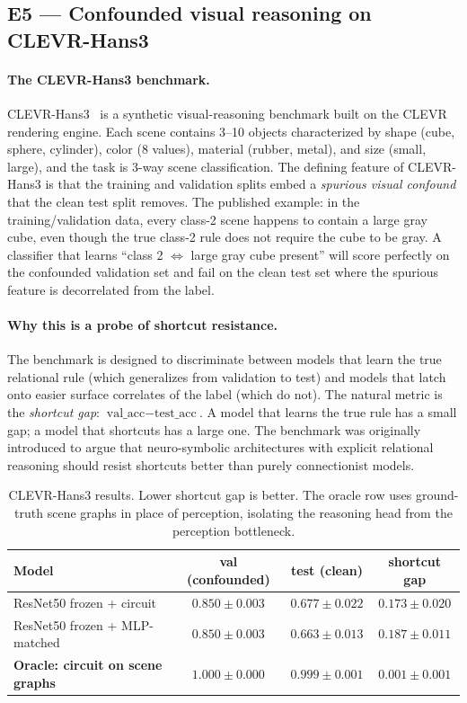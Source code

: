 \documentclass{article}
\begin{document}
\subsection{E5 --- Confounded visual reasoning on CLEVR-Hans3}
\label{sec:e5}

\paragraph{The CLEVR-Hans3 benchmark.}
CLEVR-Hans3~\citep{stammer2021right} is a synthetic visual-reasoning benchmark built on the CLEVR rendering engine.
Each scene contains 3--10 objects characterized by shape (cube, sphere, cylinder), color (8 values), material (rubber, metal), and size (small, large), and the task is 3-way scene classification.
The defining feature of CLEVR-Hans3 is that the training and validation splits embed a \emph{spurious visual confound} that the clean test split removes.
The published example: in the training/validation data, every class-2 scene happens to contain a large gray cube, even though the true class-2 rule does not require the cube to be gray.
A classifier that learns ``class 2 $\iff$ large gray cube present'' will score perfectly on the confounded validation set and fail on the clean test set where the spurious feature is decorrelated from the label.

\paragraph{Why this is a probe of shortcut resistance.}
The benchmark is designed to discriminate between models that learn the true relational rule (which generalizes from validation to test) and models that latch onto easier surface correlates of the label (which do not).
The natural metric is the \emph{shortcut gap}: $\text{val\_acc} - \text{test\_acc}$.
A model that learns the true rule has a small gap; a model that shortcuts has a large one.
The benchmark was originally introduced to argue that neuro-symbolic architectures with explicit relational reasoning should resist shortcuts better than purely connectionist models.

\begin{table}[H]
\centering
\caption{CLEVR-Hans3 results. Lower shortcut gap is better. The oracle row uses ground-truth scene graphs in place of perception, isolating the reasoning head from the perception bottleneck.}
\label{tab:clevr}
\begin{tabular}{lccc}
\toprule
\textbf{Model} & \textbf{val (confounded)} & \textbf{test (clean)} & \textbf{shortcut gap} \\
\midrule
ResNet50 frozen + circuit         & $0.850 \pm 0.003$ & $0.677 \pm 0.022$ & $0.173 \pm 0.020$ \\
ResNet50 frozen + MLP-matched     & $0.850 \pm 0.003$ & $0.663 \pm 0.013$ & $0.187 \pm 0.011$ \\
\textbf{Oracle: circuit on scene graphs} & $\mathbf{1.000 \pm 0.000}$ & $\mathbf{0.999 \pm 0.001}$ & $\mathbf{0.001 \pm 0.001}$ \\
\bottomrule
\end{tabular}
\end{table}
\end{document}
